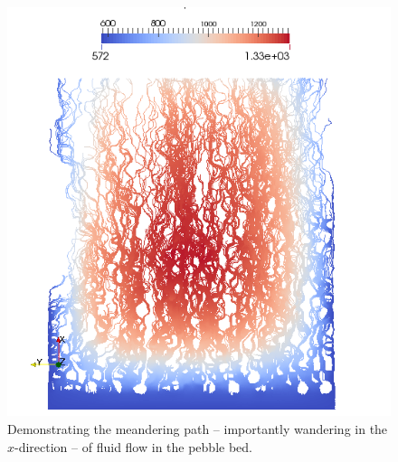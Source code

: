 \begin{figure}[t]
    \centering
    \includegraphics[width=\singleimagewidth]{chapters/figures/lbm/lbm-streamlines}
    \caption{Demonstrating the meandering path -- importantly wandering in the $x$-direction -- of fluid flow in the pebble bed.}\label{fig:lbm-streamlines}
\end{figure}

